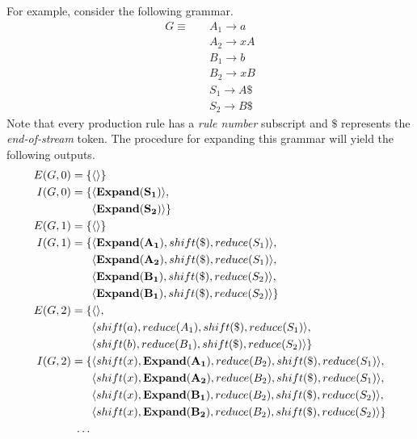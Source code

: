 \documentclass[envcountsame,runningheads]{llncs}
\begin{document}
For example, consider the following grammar.
{\small\begin{align*}
G \equiv \quad & A_1 \rightarrow a\\
               & A_2 \rightarrow x A\\
               & B_1 \rightarrow b\\
               & B_2 \rightarrow x B\\
               & S_1 \rightarrow A \$\\
               & S_2 \rightarrow B \$
\end{align*}}
Note that every production rule has a \emph{rule number} subscript and $\$$ represents the \emph{end-of-stream} token.
The procedure for expanding this grammar will yield the following outputs. 
{\small\begin{align*}
E(G, 0) = \{ & \langle \rangle \}\\
I(G, 0) = \{ & \langle \mathbf{Expand(S_1)} \rangle,\\
             & \langle \mathbf{Expand(S_2)} \rangle \}\\
E(G, 1) = \{ & \langle \rangle \}\\
I(G, 1) = \{ & \langle \mathbf{Expand(A_1)}, shift(\$), reduce(S_1) \rangle,\\
             & \langle \mathbf{Expand(A_2)}, shift(\$), reduce(S_1) \rangle,\\
             & \langle \mathbf{Expand(B_1)}, shift(\$), reduce(S_2) \rangle, \\
             & \langle \mathbf{Expand(B_1)}, shift(\$), reduce(S_2) \rangle \}\\
E(G, 2) = \{ & \langle \rangle, \\
             & \langle shift(a), reduce(A_1), shift(\$), reduce(S_1) \rangle,\\
             & \langle shift(b), reduce(B_1), shift(\$), reduce(S_2) \rangle \}\\
I(G, 2) = \{ & \langle shift(x), \mathbf{Expand(A_1)}, reduce(B_2), shift(\$), reduce(S_1) \rangle,\\
             & \langle shift(x), \mathbf{Expand(A_2)}, reduce(B_2), shift(\$), reduce(S_1) \rangle,\\
             & \langle shift(x), \mathbf{Expand(B_1)}, reduce(B_2), shift(\$), reduce(S_2) \rangle,\\
             & \langle shift(x), \mathbf{Expand(B_2)}, reduce(B_2), shift(\$), reduce(S_2) \rangle \}\\
\textellipsis
\end{align*}}
\end{document}
